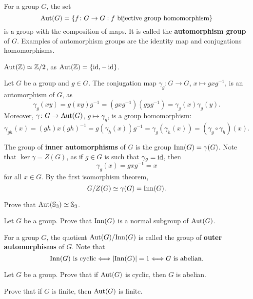 For a group $G$, 
the set 
\[
\operatorname{Aut}(G)=\{f\colon G\to G:f\text{ bijective group homomorphism}\}
\]
is a group with the composition of maps. It is called 
the \textbf{automorphism group} of $G$. 
Examples of automorphism groups are the identity map and 
conjugations homomorphisms. 

\begin{example}
$\operatorname{Aut}(\mathbb{Z})\simeq\mathbb{Z}/2$, as $\operatorname{Aut}(\mathbb{Z})=\{\operatorname{id},-\operatorname{id}\}$.
\end{example}

\begin{example}
Let $G$ be a group and $g\in G$. The conjugation 
map $\gamma_g\colon G\to G$, $x\mapsto gxg^{-1}$,
is an automorphism of $G$, as 
\[
\gamma_g(xy)=g(xy)g^{-1}=(gxg^{-1})(gyg^{-1})=\gamma_g(x)\gamma_g(y).
\]
Moreover, $\gamma\colon G\to\operatorname{Aut}(G)$, $g\mapsto\gamma_g$, is a group
homomorphism:
\[
\gamma_{gh}(x)=(gh)x(gh)^{-1}=g(\gamma_h(x))g^{-1}=\gamma_g(\gamma_h(x))=(\gamma_g\circ\gamma_h)(x).
\]

The group of \textbf{inner automorphisms} of $G$ is the 
group 
$\mathrm{Inn}(G)=\gamma(G)$. Note that $\ker\gamma=Z(G)$, as
if $g\in G$ is such that $\gamma_g=\operatorname{id}$, then 
\[
\gamma_g(x)=gxg^{-1}=x
\]
for all $x\in G$. By the first isomorphism theorem, 
\[
G/Z(G)\simeq \gamma(G)=\mathrm{Inn}(G).
\]
\end{example}

\begin{exercise}
\label{xca:aut(S3)}
    Prove that $\operatorname{Aut}(\mathbb{S}_3)\simeq\mathbb{S}_3$. 
\end{exercise}

\begin{exercise}
    Let $G$ be a group. Prove that $\mathrm{Inn}(G)$ is a normal subgroup of $\operatorname{Aut}(G)$. 
\end{exercise} 

For a group $G$, the quotient $\operatorname{Aut}(G)/\mathrm{Inn}(G)$ is called 
the group of \textbf{outer automorphisms} of $G$. 
Note that 
\[
\mathrm{Inn}(G)\text{ is cyclic}\Longleftrightarrow
|\mathrm{Inn}(G)|=1\Longleftrightarrow
G\text{ is abelian.}
\]

\begin{exercise}
Let $G$ be a group. 
Prove that if $\operatorname{Aut}(G)$ is cyclic, then 
$G$ is abelian. 
\end{exercise}

\begin{exercise}
    Prove that if $G$ is finite, then $\operatorname{Aut}(G)$ is finite.
\end{exercise}



